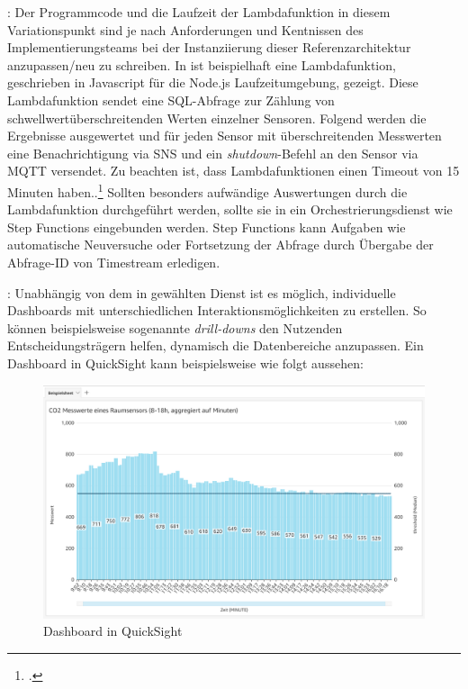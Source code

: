 : Der Programmcode und die Laufzeit der Lambdafunktion in diesem Variationspunkt sind je nach Anforderungen und Kentnissen des Implementierungsteams bei der Instanziierung dieser Referenzarchitektur anzupassen/neu zu schreiben. In  ist beispielhaft eine Lambdafunktion, geschrieben in Javascript für die Node.js Laufzeitumgebung, gezeigt. Diese Lambdafunktion sendet eine \ac{SQL}-Abfrage zur Zählung von schwellwertüberschreitenden Werten einzelner Sensoren. Folgend werden die Ergebnisse ausgewertet und für jeden Sensor mit überschreitenden Messwerten eine Benachrichtigung via SNS und ein \textit{shutdown}-Befehl an den Sensor via \ac{MQTT} versendet. Zu beachten ist, dass Lambdafunktionen einen Timeout von 15 Minuten haben..\footcite[Vgl.][]{AmazonWebServicesInc..o.J.bv} Sollten besonders aufwändige Auswertungen durch die Lambdafunktion durchgeführt werden, sollte sie in ein Orchestrierungsdienst wie Step Functions eingebunden werden. Step Functions kann Aufgaben wie automatische Neuversuche oder Fortsetzung der Abfrage durch Übergabe der Abfrage-ID von Timestream erledigen.

: Unabhängig von dem in  gewählten Dienst ist es möglich, individuelle Dashboards mit unterschiedlichen Interaktionsmöglichkeiten zu erstellen. So können beispielsweise sogenannte \textit{drill-downs} den Nutzenden Entscheidungsträgern helfen, dynamisch die Datenbereiche anzupassen. Ein Dashboard in QuickSight kann beispielsweise wie folgt aussehen:
\begin{figure}[H]
\centering
\includegraphics[width=\textwidth]{graphics/QuickSight-Beispiel.png}
\caption{Dashboard in QuickSight}
\label{abb:DashboardDBRA}
\end{figure}


